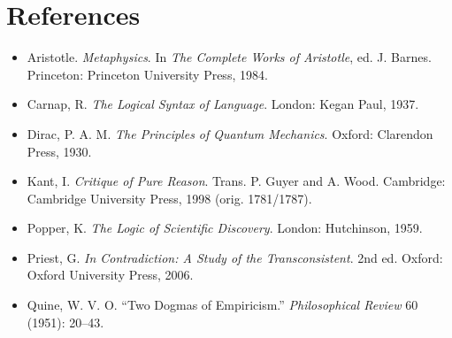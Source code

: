 \documentclass[12pt]{article}
\begin{document}
\section*{References}
\begin{itemize}
    \item Aristotle. \emph{Metaphysics}. In \emph{The Complete Works of Aristotle}, ed. J. Barnes. Princeton: Princeton University Press, 1984.
    \item Carnap, R. \emph{The Logical Syntax of Language}. London: Kegan Paul, 1937.
    \item Dirac, P. A. M. \emph{The Principles of Quantum Mechanics}. Oxford: Clarendon Press, 1930.
    \item Kant, I. \emph{Critique of Pure Reason}. Trans. P. Guyer and A. Wood. Cambridge: Cambridge University Press, 1998 (orig. 1781/1787).
    \item Popper, K. \emph{The Logic of Scientific Discovery}. London: Hutchinson, 1959.
    \item Priest, G. \emph{In Contradiction: A Study of the Transconsistent}. 2nd ed. Oxford: Oxford University Press, 2006.
    \item Quine, W. V. O. ``Two Dogmas of Empiricism.'' \emph{Philosophical Review} 60 (1951): 20--43.
\end{itemize}
\end{document}
